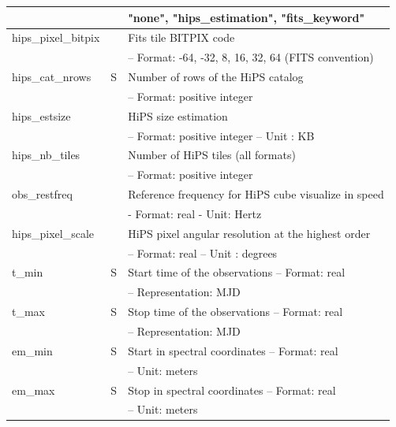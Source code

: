 \documentclass[11pt,a4paper]{ivoa}
\begin{document}
\begin{longtable}{|l|c|l|}
 & & "none", "hips\_estimation", "fits\_keyword" \\ \hline
hips\_pixel\_bitpix &   & Fits tile BITPIX code\\ & & – Format: -64, -32, 8, 16, 32, 64 (FITS convention) \\ \hline
hips\_cat\_nrows & S & Number of rows of the HiPS catalog\\ & & – Format: positive integer \\ \hline
hips\_estsize &   & HiPS size estimation\\ & &  – Format: positive integer – Unit : KB \\ \hline
hips\_nb\_tiles &   & Number of HiPS tiles (all formats)\\ & &  – Format: positive integer \\ \hline
obs\_restfreq &   & Reference frequency for HiPS cube visualize in speed\\ & & - Format: real - Unit: Hertz \\ \hline
hips\_pixel\_scale &   & HiPS pixel angular resolution at the highest order\\ & & – Format: real – Unit : degrees \\ \hline
t\_min & S & Start time of the observations – Format: real\\ & & – Representation: MJD  \\ \hline 
t\_max & S & Stop time of the observations – Format: real \\ & & – Representation: MJD \\ \hline
em\_min & S & Start in spectral coordinates – Format: real \\ & & – Unit: meters \\ \hline
em\_max & S & Stop in spectral coordinates – Format: real \\ & & – Unit: meters \\ \hline

\end{longtable}
\end{document}
